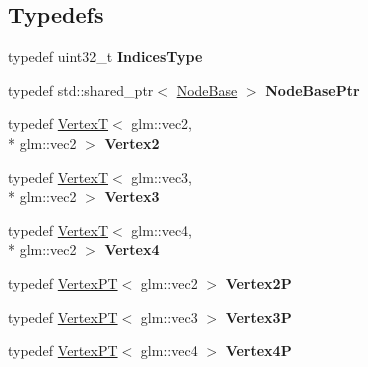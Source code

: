 \subsection*{Typedefs}
\begin{DoxyCompactItemize}
\item 
\hypertarget{namespaces9_a1a4285937536b279241df77bf0280883}{typedef uint32\-\_\-t {\bfseries Indices\-Type}}\label{namespaces9_a1a4285937536b279241df77bf0280883}

\item 
\hypertarget{namespaces9_a0d2599cef0f80878b639d24d9d56f867}{typedef std\-::shared\-\_\-ptr$<$ \hyperlink{classs9_1_1NodeBase}{Node\-Base} $>$ {\bfseries Node\-Base\-Ptr}}\label{namespaces9_a0d2599cef0f80878b639d24d9d56f867}

\item 
\hypertarget{namespaces9_a92ead42bcd1533932fe88ad2bee13e69}{typedef \hyperlink{structs9_1_1VertexT}{Vertex\-T}$<$ glm\-::vec2, \\*
glm\-::vec2 $>$ {\bfseries Vertex2}}\label{namespaces9_a92ead42bcd1533932fe88ad2bee13e69}

\item 
\hypertarget{namespaces9_ac01a104c4bb68376b72b325cc7e74a56}{typedef \hyperlink{structs9_1_1VertexT}{Vertex\-T}$<$ glm\-::vec3, \\*
glm\-::vec2 $>$ {\bfseries Vertex3}}\label{namespaces9_ac01a104c4bb68376b72b325cc7e74a56}

\item 
\hypertarget{namespaces9_ad533b413e437b87b03e117165cb1fc26}{typedef \hyperlink{structs9_1_1VertexT}{Vertex\-T}$<$ glm\-::vec4, \\*
glm\-::vec2 $>$ {\bfseries Vertex4}}\label{namespaces9_ad533b413e437b87b03e117165cb1fc26}

\item 
\hypertarget{namespaces9_ab06db9240c7a88660643ec1fee659275}{typedef \hyperlink{structs9_1_1VertexPT}{Vertex\-P\-T}$<$ glm\-::vec2 $>$ {\bfseries Vertex2\-P}}\label{namespaces9_ab06db9240c7a88660643ec1fee659275}

\item 
\hypertarget{namespaces9_a665382c44c782ae380543be532857b68}{typedef \hyperlink{structs9_1_1VertexPT}{Vertex\-P\-T}$<$ glm\-::vec3 $>$ {\bfseries Vertex3\-P}}\label{namespaces9_a665382c44c782ae380543be532857b68}

\item 
\hypertarget{namespaces9_a39f5546e9e5eadc1abf8b53896e0a7f6}{typedef \hyperlink{structs9_1_1VertexPT}{Vertex\-P\-T}$<$ glm\-::vec4 $>$ {\bfseries Vertex4\-P}}\label{namespaces9_a39f5546e9e5eadc1abf8b53896e0a7f6}


\end{DoxyCompactItemize}
